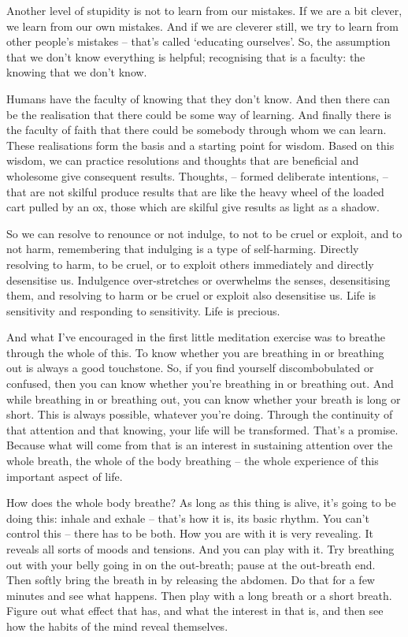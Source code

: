 Another level of stupidity is not to learn from our mistakes. If we are a bit
clever, we learn from our own mistakes. And if we are cleverer still, we try to
learn from other people's mistakes -- that's called `educating ourselves'. So,
the assumption that we don't know everything is helpful; recognising that is a
faculty: the knowing that we don't know.

Humans have the faculty of knowing that they don't know. And then there can be
the realisation that there could be some way of learning. And 
finally there is the faculty of faith that there could be somebody through whom we can learn. These realisations form the
basis and a starting point for wisdom. Based on this wisdom, we can practice resolutions and thoughts
that are beneficial and wholesome give consequent results. Thoughts, -- formed
deliberate intentions, -- that are not skilful produce results that are like the heavy
wheel of the loaded cart pulled by an ox, those which are skilful give results as light as a
shadow.

So we can resolve to renounce or not indulge, to not to be cruel or
exploit, and to not harm, remembering that indulging is a type of self-harming.
Directly resolving to harm, to be cruel, or to exploit others immediately and directly desensitise us.
Indulgence over-stretches or overwhelms the senses, desensitising them, and
resolving to harm or be cruel or exploit also desensitise us. Life is
sensitivity and responding to sensitivity. Life is precious.

And what I've encouraged in the first little meditation exercise was to
breathe through the whole of this. To know whether you are breathing in or
breathing out is always a good touchstone. So, if you find yourself
discombobulated or confused, then you can know whether you're breathing in or
breathing out. And while breathing in or breathing out, you can know whether
your breath is long or short. This is always possible, whatever you're doing.
Through the continuity of that attention and that knowing, your life will be
transformed. That's a promise. Because what will come from that is an interest
in sustaining attention over the whole breath, the whole of the body breathing
-- the whole experience of this important aspect of life.

How does the whole body breathe? As long as this thing is alive, it's going to
be doing this: inhale and exhale -- that's how it is, its basic rhythm. You
can't control this -- there has to be both. How you are with it is very
revealing. It reveals all sorts of moods and tensions. And you can play with it.
Try breathing out with your belly going in on the out-breath; pause at the out-breath end. Then
softly bring the breath in by releasing the abdomen. Do that for a
few minutes and see what happens. Then play with a long breath or a short
breath. Figure out what effect that has, and what the interest in that is, and
then see how the habits of the mind reveal themselves.

